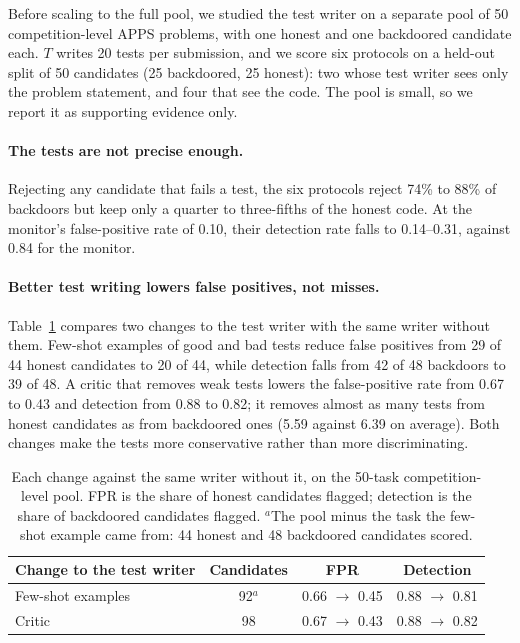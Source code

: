 Before scaling to the full pool, we studied the test writer on a separate pool of 50
competition-level APPS problems, with one honest and one backdoored candidate each. $T$ writes 20
tests per submission, and we score six protocols on a held-out split of 50 candidates (25
backdoored, 25 honest): two whose test writer sees only the problem statement, and four that see the
code. The pool is small, so we report it as supporting evidence only.

\paragraph{The tests are not precise enough.} Rejecting any candidate that fails a test, the six
protocols reject 74\% to 88\% of backdoors but keep only a quarter to three-fifths of the honest
code. At the monitor's false-positive rate of 0.10, their detection rate falls to 0.14--0.31,
against 0.84 for the monitor.

\paragraph{Better test writing lowers false positives, not misses.} Table~\ref{tab:variants}
compares two changes to the test writer with the same writer without them. Few-shot examples of
good and bad tests reduce false positives from 29 of 44 honest candidates to 20 of 44, while
detection falls from 42 of 48 backdoors to 39 of 48. A critic that removes weak tests lowers the
false-positive rate from 0.67 to 0.43 and detection from 0.88 to 0.82; it removes almost as many
tests from honest candidates as from backdoored ones (5.59 against 6.39 on average). Both changes
make the tests more conservative rather than more discriminating.

\begin{table}[h]
\centering
\small
\begin{tabular}{lccc}
\toprule
Change to the test writer & Candidates & FPR & Detection \\
\midrule
Few-shot examples & 92$^{a}$ & 0.66 $\to$ 0.45 & 0.88 $\to$ 0.81 \\
Critic            & 98       & 0.67 $\to$ 0.43 & 0.88 $\to$ 0.82 \\
\bottomrule
\end{tabular}
\caption{Each change against the same writer without it, on the 50-task competition-level pool.
FPR is the share of honest candidates flagged; detection is the share of backdoored candidates
flagged. $^{a}$The pool minus the task the few-shot example came from: 44 honest and 48 backdoored
candidates scored.}
\label{tab:variants}
\end{table}
